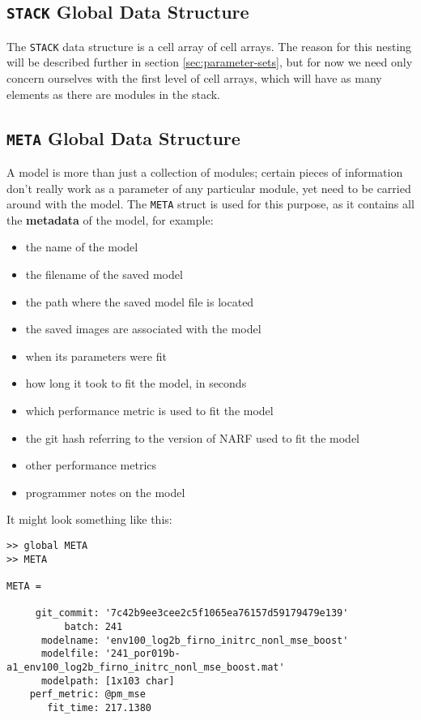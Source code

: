 \documentclass[letterpaper]{report}
\newcommand{\definition}[1]{\textbf{#1}}
\newcommand{\matlab}[1]{\texttt{#1}}
\begin{document}
\subsection{\matlab{STACK} Global Data Structure}

The \matlab{STACK} data structure is a cell array of cell arrays. The reason for this nesting will be described further in section \ref{sec:parameter-sets}, but for now we need only concern ourselves with the first level of cell arrays, which will have as many elements as there are modules in the stack. 

\subsection{\matlab{META} Global Data Structure}

A model is more than just a collection of modules; certain pieces of information don't really work as a parameter of any particular module, yet need to be carried around with the model. The \matlab{META} struct is used for this purpose, as it contains all the \definition{metadata} of the model, for example:

\begin{itemize}
  \item the name of the model
  \item the filename of the saved model
  \item the path where the saved model file is located
  \item the saved images are associated with the model
  \item when its parameters were fit
  \item how long it took to fit the model, in seconds
  \item which performance metric is used to fit the model
  \item the git hash referring to the version of NARF used to fit the model
  \item other performance metrics
  \item programmer notes on the model
\end{itemize}

It might look something like this:

\begin{verbatim}
>> global META
>> META

META = 

     git_commit: '7c42b9ee3cee2c5f1065ea76157d59179479e139'
          batch: 241
      modelname: 'env100_log2b_firno_initrc_nonl_mse_boost'
      modelfile: '241_por019b-a1_env100_log2b_firno_initrc_nonl_mse_boost.mat'
      modelpath: [1x103 char]
    perf_metric: @pm_mse
       fit_time: 217.1380
\end{verbatim}
\end{document}
